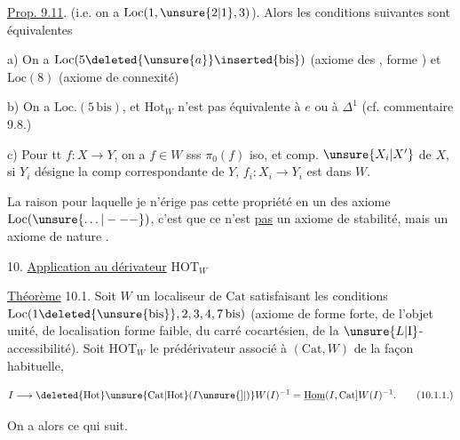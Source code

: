 \uline{Prop. 9.11}.  
(i.e. on a $\mathrm{Loc}(1,\unsure{2|1},3)$). Alors les conditions
suivantes sont équivalentes

a) On a $\mathrm{Loc}(5\deleted{\unsure{a}}\inserted{\mathrm{bis}})$ (axiome des ,
forme ) et $\mathrm{Loc}(8)$ (axiome de connexité)

b) On a $\mathrm{Loc}.(5\,\mathrm{bis})$, et $\mathrm{Hot}_{W}$ n'est pas
équivalente à $e$ ou à $\Delta^1$ (cf. commentaire
9.8.)

c) Pour tt $f:X\to Y$, on a $f\in W$ sss
$\pi_0(f)$ iso, et   comp. 
$\unsure{X_i|X'}$ de $X$, si $Y_i$ désigne la comp correspondante de $Y$,  $f_i:X_i\to Y_i$
est dans $W$.


La raison  pour laquelle je n'érige
pas cette propriété en un des \unsure{-} axiome
$\mathrm{Loc}(\unsure{\ldots|---})$, c'est que ce n'est \uline{pas} un axiome
de stabilité, mais un axiome de nature
.

10. \uline{Application au dérivateur} $\mathrm{HOT}_{W}$

\uline{Théorème} 10.1. Soit $W$ un localiseur de $\mathrm{Cat}$ satisfaisant les conditions $\mathrm{Loc}(1\deleted{\unsure{\mathrm{bis}}},2,3,4,7\,\mathrm{bis})$
(axiome de  forme forte, de l'objet unité,
de localisation forme faible, du carré cocartésien, de la
 $\unsure{L|\mathrm I}$-accessibilité). 
Soit $\mathrm{HOT}_{W}$ le prédérivateur  associé à $(\mathrm{Cat},W)$
de la façon habituelle,

\[
 I\longrightarrow \deleted{\mathrm{Hot}}\unsure{\mathrm{Cat}|\mathrm{Hot}}(I\unsure{]|)}W(I)^{-1}
 =\underline{\mathrm{Hom}}(I,\mathrm{Cat}]W(I)^{-1}.
 \tag*{(10.1.1.)}
\]

On a alors ce qui suit.

